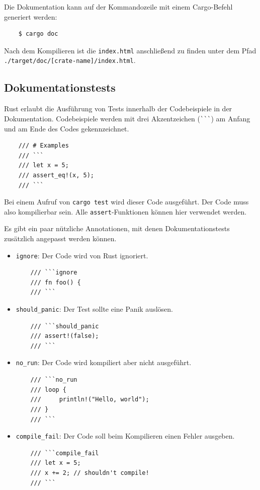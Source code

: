 Die Dokumentation kann auf der Kommandozeile mit einem Cargo-Befehl ge\-ne\-riert werden:

\begin{lstlisting}
    $ cargo doc
\end{lstlisting}

Nach dem Kompilieren ist die \verb"index.html" anschließend zu finden unter dem Pfad \texttt{./target/doc/[crate-name]/index.html}.

\subsection{Dokumentationstests}

Rust erlaubt die Ausführung von Tests innerhalb der Codebeispiele in der Dokumentation. Codebeispiele werden mit drei Akzentzeichen (\verb"```") am Anfang und am Ende des Codes gekennzeichnet.

\begin{lstlisting}
    /// # Examples
    /// ```
    /// let x = 5;
    /// assert_eq!(x, 5);
    /// ```
\end{lstlisting}

Bei einem Aufruf von \verb"cargo test" wird dieser Code ausgeführt. Der Code muss also kompilierbar sein. Alle \verb"assert"-Funktionen können hier verwendet werden.

Es gibt ein paar nützliche Annotationen, mit denen Dokumentationstests zu\-sätz\-lich angepasst werden können.

\newpage

\begin{itemize}
    \item \verb"ignore": Der Code wird von Rust ignoriert.
          \begin{lstlisting}
    /// ```ignore
    /// fn foo() {
    /// ```
\end{lstlisting}
    \item \verb"should_panic": Der Test sollte eine Panik auslösen.
          \begin{lstlisting}
    /// ```should_panic
    /// assert!(false);
    /// ```
\end{lstlisting}
    \item \verb"no_run": Der Code wird kompiliert aber nicht ausgeführt.
          \begin{lstlisting}
    /// ```no_run
    /// loop {
    ///     println!("Hello, world");
    /// }
    /// ```
\end{lstlisting}
    \item \verb"compile_fail": Der Code soll beim Kompilieren einen Fehler ausgeben.
          \begin{lstlisting}
    /// ```compile_fail
    /// let x = 5;
    /// x += 2; // shouldn't compile!
    /// ```
\end{lstlisting}
\end{itemize}



